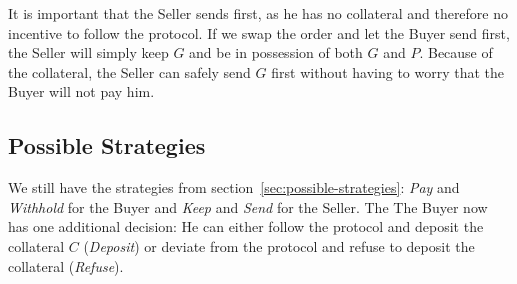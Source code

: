 \documentclass{cacthesis}
\begin{document}
It is important that the Seller sends first, as he has no collateral and therefore no incentive to follow the protocol. If we swap the order and let the Buyer send first, the Seller will simply keep $G$ and be in possession of both $G$ and $P$. Because of the collateral, the Seller can safely send $G$ first without having to worry that the Buyer will not pay him.\newline

\subsection{Possible Strategies}
\label{sec:possible-strategies-buyercol}
We still have the strategies from section~\ref{sec:possible-strategies}: \emph{Pay} and \emph{Withhold} for the Buyer and \emph{Keep} and \emph{Send} for the Seller. The The Buyer now has one additional decision: He can either follow the protocol and deposit the collateral $C$ (\emph{Deposit}) or deviate from the protocol and refuse to deposit the collateral (\emph{Refuse}).
\end{document}
